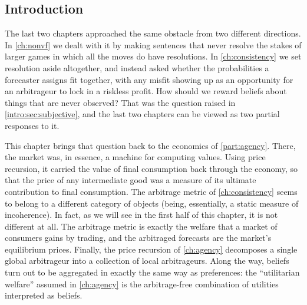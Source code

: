\begin{draftblock}

\section{Introduction}\label{arb:sec:intro}

The last two chapters approached the same obstacle from two different directions. In \cref{ch:nonvf} we dealt with it by making sentences that never resolve the stakes of larger games in which all the moves do have resolutions. In \cref{ch:consistency} we set resolution aside altogether, and instead asked whether the probabilities a forecaster assigns fit together, with any misfit showing up as an opportunity for an arbitrageur to lock in a riskless profit. How should we reward beliefs about things that are never observed? That was the question raised in \cref{intro:sec:subjective}, and the last two chapters can be viewed as two partial responses to it.

This chapter brings that question back to the economics of \cref{part:agency}. There, the market was, in essence, a machine for computing values. Using price recursion, it carried the value of final consumption back through the economy, so that the price of any intermediate good was a measure of its ultimate contribution to final consumption. The arbitrage metric of \cref{ch:consistency} seems to belong to a different category of objects (being, essentially, a static measure of incoherence). In fact, as we will see in the first half of this chapter, it is not different at all. The arbitrage metric is exactly the welfare that a market of consumers gains by trading, and the arbitraged forecasts are the market's equilibrium prices. Finally, the price recursion of \cref{ch:agency} decomposes a single global arbitrageur into a collection of local arbitrageurs. Along the way, beliefs turn out to be aggregated in exactly the same way as preferences: the ``utilitarian welfare'' assumed in \cref{ch:agency} is the arbitrage-free combination of utilities interpreted as beliefs.


\end{draftblock}
